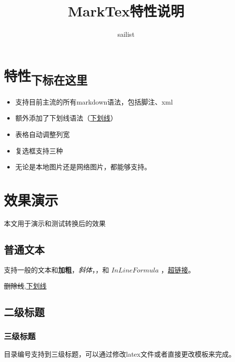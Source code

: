 \documentclass{article}
\title{MarkTex特性说明}
\author{sailist}
\begin{document}
\normalsize
\maketitle
\tableofcontents
\newpage









\section{特性\textsubscript{下标在这里}}


\begin{itemize}
\item
支持目前主流的所有markdown语法，包括脚注、xml
\item
额外添加了下划线语法（\underline{下划线}）
\item
表格自动调整列宽
\item
复选框支持三种
\item
无论是本地图片还是网络图片，都能够支持。
\end{itemize}



\section{效果演示}




本文用于演示和测试转换后的效果


\subsection{普通文本}


支持一般的文本和\textbf{加粗}，\textit{斜体}，，和 $InLine Formula$ ，\href{http://github.com}{超链接}。


\sout{删除线},\underline{下划线}


\subsection{二级标题}




\subsubsection{三级标题}


目录编号支持到三级标题，可以通过修改latex文件或者直接更改模板来完成。
\end{document}
